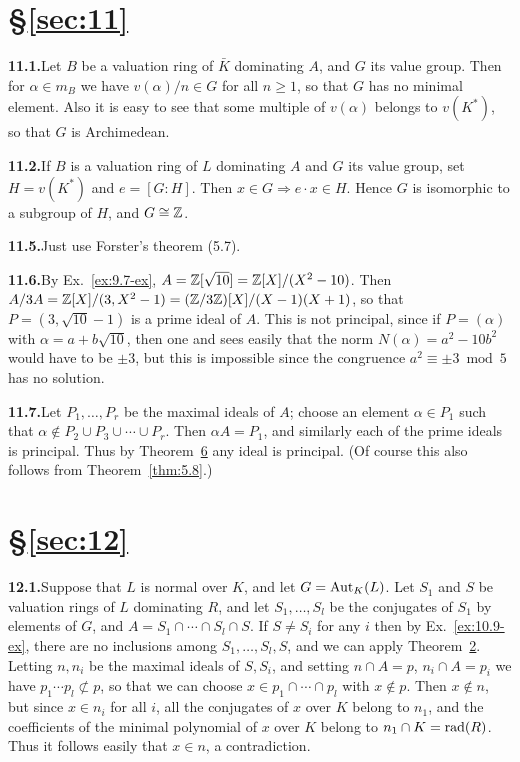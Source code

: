 \section*{\S\ref{sec:11}}

\noindent\textbf{11.1.}\quad Let $B$ be a valuation ring of $\bar{K}$ dominating $A$, and $G$ its value group. Then
for $\alpha \in m_B$ we have $v(\alpha)/n \in G$ for all $n \ge 1$, so that $G$ has no minimal element. Also it is
easy to see that some multiple of $v(\alpha)$ belongs to $v(K^*)$, so that $G$ is
Archimedean.

\noindent\textbf{11.2.}\quad If $B$ is a valuation ring of $L$ dominating $A$ and $G$ its value group, set
$H = v(K^*)$ and $e = [G:H]$. Then $x \in G \Rightarrow e \cdot x \in H$. Hence $G$ is isomorphic to a
subgroup of $H$, and $G \cong \mathbb{Z}$.

\noindent\textbf{11.5.}\quad Just use Forster's theorem (5.7).

\noindent\textbf{11.6.}\quad By Ex.~\ref{ex:9.7-ex}, $A = \mathbb{Z}[\sqrt{10}] = \mathbb{Z}[X]/(X^2 - 10)$. Then $A/3A = \mathbb{Z}[X]/(3,
X^2 - 1) = (\mathbb{Z}/3\mathbb{Z})[X]/(X - 1)(X + 1)$, so that $P = (3, \sqrt{10} - 1)$ is a prime
ideal of $A$. This is not principal, since if $P = (\alpha)$ with $\alpha = a + b\sqrt{10}$, then
one and sees easily that the norm $N(\alpha) = a^2 - 10b^2$ would have to be $\pm 3$,
but this is impossible since the congruence $a^2 \equiv \pm 3 \bmod 5$ has no solution.

\noindent\textbf{11.7.}\quad Let $P_1, \ldots, P_r$ be the maximal ideals of $A$; choose an element $\alpha \in P_1$ such
that $\alpha \notin P_2 \cup P_3 \cup \cdots \cup P_r$. Then $\alpha A = P_1$, and similarly each of the prime
ideals is principal. Thus by Theorem~\hyperref[thm:11.6]{6} any ideal is principal. (Of course
this also follows from Theorem~\ref{thm:5.8}.)

\section*{\S\ref{sec:12}}

\noindent\textbf{12.1.}\quad Suppose that $L$ is normal over $K$, and let $G = \operatorname{Aut}_K(L)$. Let $S_1$ and $S$ be
valuation rings of $L$ dominating $R$, and let $S_1, \ldots, S_l$ be the conjugates
of $S_1$ by elements of $G$, and $A = S_1 \cap \cdots \cap S_l \cap S$. If $S \neq S_i$ for any $i$ then by
Ex.~\ref{ex:10.9-ex}, there are no inclusions among $S_1, \ldots, S_l, S$, and we can apply
Theorem~\hyperref[thm:12.2]{2}. Letting $n, n_i$ be the maximal ideals of $S, S_i$, and setting
$n \cap A = p$, $n_i \cap A = p_i$ we have $p_1 \cdots p_l \not\subset p$, so that we can choose
$x \in p_1 \cap \cdots \cap p_l$ with $x \notin p$. Then $x \notin n$, but since $x \in n_i$ for all $i$, all the
conjugates of $x$ over $K$ belong to $n_1$, and the coefficients of the minimal
polynomial of $x$ over $K$ belong to $n_1 \cap K = \operatorname{rad}(R)$. Thus it follows easily
that $x \in n$, a contradiction.

